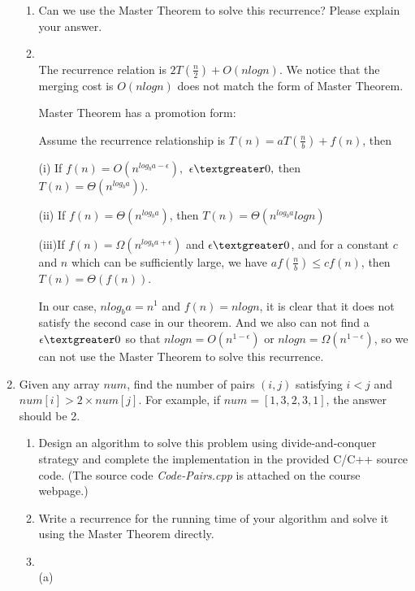 \documentclass[12pt,a4paper]{article}
\makeatletter
\newtheorem*{solution}{Solution}
\theoremstyle{definition}
\renewenvironment{solution}[1][Solution] {\par\pushQED{\qed}\normalfont\topsep6\p@\@plus6\p@\relax\trivlist\item[\hskip\labelsep\bfseries#1\@addpunct{.}]\ignorespaces}{\popQED\endtrivlist\@endpefalse} \makeatother
\makeatother
\begin{document}
\begin{enumerate}
\begin{enumerate}
        \item
        Can we use the Master Theorem to solve this recurrence? Please explain your answer.
        \begin{solution}
            ~\\
            The recurrence relation is $2T(\frac{n}{2})+O(nlogn)$. We notice that the merging cost is $O(nlogn)$ does not match the form of Master Theorem.
            
            Master Theorem has a promotion form:
            
            Assume the recurrence relationship is $T(n)=aT(\frac{n}{b})+f(n)$, then
            
            (i) If $f(n)=O(n^{log_ba-\epsilon}), $ $\epsilon\textgreater0,$ then $T(n)=\Theta(n^{log_ba}))$.
            
            (ii) If $f(n)=\Theta(n^{log_ba})$, then $T(n)=\Theta(n^{log_ba}logn)$
            
            (iii)If $f(n)=\Omega({n^{log_ba+\epsilon}})$ and $\epsilon\textgreater0$, and for a constant $c$ and $n$ which can be sufficiently large, we have $af(\frac{n}{b})\le cf(n)$, then $T(n)=\Theta(f(n))$.
            
            In our case, $nlog_ba=n^1$ and $f(n)=nlogn$, it is clear that it does not satisfy the second case in our theorem. And we also can not find a $\epsilon\textgreater0$ so that $nlogn=O(n^{1-\epsilon})$ or $nlogn=\Omega(n^{1-\epsilon})$, so we can not use the Master Theorem to solve this recurrence.
            
            
        \end{solution}

    \end{enumerate}

    \item
    Given any array $num$, find the number of pairs $(i, j)$ satisfying $i < j$ and $num[i] > 2 \times num[j]$. For example, if $num=[1,3,2,3,1]$, the answer should be 2.
    \begin{enumerate}
        \item
         Design an algorithm to solve this problem using divide-and-conquer strategy and complete the implementation in the provided C/C++ source code. {\color{blue}(The source code \emph{Code-Pairs.cpp} is attached on the course webpage.)}

        \item
        Write a recurrence for the running time of your algorithm and solve it using the Master Theorem directly.
        \begin{solution}
        	~\\
        (a)	
        

\end{solution}
\end{enumerate}
\end{enumerate}
\end{document}
